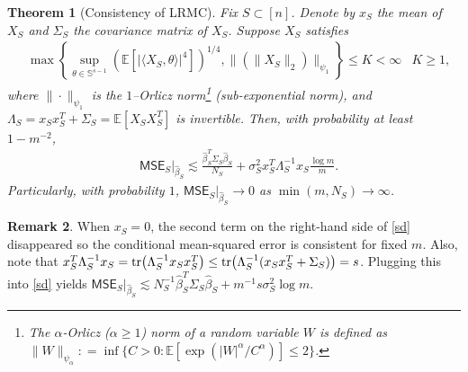 \documentclass[a4paper,11pt]{article}
\numberwithin{equation}{section}
\theoremstyle{plain}
\newtheorem{Th}{Theorem}[section]
\theoremstyle{definition}
\newtheorem{Rem}[Th]{Remark}
\def\E{{\mathbb E}}
\def\P{{\mathbb P}}
\def\mse{{\textsf{MSE}}}
\begin{document}
\begin{Th}[Consistency of LRMC]\label{thm:conss}
Fix $S\subset [n]$.
Denote by $x_S$ the mean of $X_S$ and $\Sigma_S$ the covariance matrix of $X_S$. 
Suppose $X_S$ satisfies
\begin{align}
&\max\left\{\sup_{\theta\in\mathbb S^{s-1}}(\E[|\langle X_S,\theta\rangle|^4])^{1/4}, \|(\|X_S\|_2)\|_{\psi_1}\right\} \leq K<\infty&K\geq 1, 
\end{align}
where $\|\cdot\|_{\psi_1}$ is the $1$--Orlicz norm\footnote{The $\alpha$-Orlicz ($\alpha\geq 1$) norm of a random variable $W$ is defined as $\|W\|_{\psi_\alpha}: = \inf\{C>0: \E[\exp(|W|^\alpha/C^\alpha)]\leq 2\}$.} (sub-exponential norm), and
$\Lambda_S =  x_Sx_S^T +\Sigma_S = \E[X_SX_S^T]$ is invertible. 
Then, with probability at least $1-m^{-2}$, 
\begin{align}
&\mse_S|_{\widehat{\beta}_S} \lesssim \frac{\widehat{\beta}_S^T\Sigma_S\widehat{\beta}_S}{N_S}+\sigma_S^2x_S^T\Lambda_S^{-1}x_S\frac{\log m}{m}.\label{sd}
\end{align}
Particularly, with probability $1$, $\mse_S|_{\widehat{\beta}_S}\to 0$ as $\min(m, N_S)\to\infty$. 
\end{Th}


\begin{Rem}
When $x_S =0$, the second term on the right-hand side of \eqref{sd} disappeared so the conditional mean-squared error is consistent for fixed $m$. Also, note that $x_S^T\Lambda_S^{-1}x_S = \tr(\Lambda_S^{-1}x_Sx_S^T)\leq \tr(\Lambda_S^{-1}(x_Sx_S^T+\Sigma_S))= s$. Plugging this into \eqref{sd} yields $\mse_S|_{\widehat{\beta}_S} \lesssim N_S^{-1}\widehat{\beta}_S^T\Sigma_S\widehat{\beta}_S+m^{-1}s\sigma_S^2\log m$. 
\end{Rem}

\end{document}
